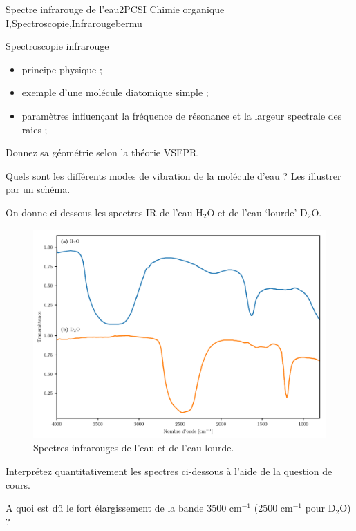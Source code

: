 
\begin{exercise}{Spectre infrarouge de l'eau}{2}{PCSI}
{Chimie organique I,Spectroscopie,Infrarouge}{bermu}

\begin{questions}
\questioncours Spectroscopie infrarouge
\begin{itemize}
    \item principe physique ;
    \item exemple d'une molécule diatomique simple ;
    \item paramètres influençant la fréquence de résonance et la largeur spectrale des raies ;
\end{itemize}


\question Donnez sa géométrie selon la théorie VSEPR.

\question Quels sont les différents modes de vibration de la molécule d'eau ? Les illustrer par un schéma.

\begin{EnvUplevel}
    On donne ci-dessous les spectres IR de l'eau $\mathrm{H_2O}$ et de l'eau ‘lourde’ $\mathrm{D_2O}$.
    
    \begin{figure}[H]
        \centering
        \includegraphics[width=\linewidth]{chimiePC/orga/H2OD2O.pdf}\vspace{-1em}
        \caption{Spectres infrarouges de l'eau et de l'eau lourde.}
    \end{figure}
\end{EnvUplevel}

\question Interprétez quantitativement les spectres ci-dessous à l'aide de la question de cours.

\question A quoi est dû le fort élargissement de la bande 3500 cm$^{-1}$ (2500 cm$^{-1}$ pour $\mathrm{D_2O}$) ?
\end{questions}
\end{exercise}